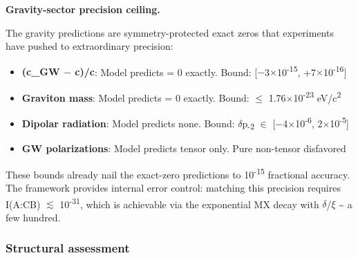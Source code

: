 \documentclass[11pt,a4paper]{article}
\theoremstyle{remark}
\providecommand{\tightlist}{%
  \setlength{\itemsep}{0pt}\setlength{\parskip}{0pt}}
\begin{document}
\textbf{Gravity-sector precision ceiling.}

The gravity predictions are symmetry-protected exact zeros that experiments
have pushed to extraordinary precision:

\begin{itemize}
\tightlist
\item
  \textbf{(c\_GW \ensuremath{-} c)/c}: Model predicts = 0 exactly. Bound: {[}\ensuremath{-}3\ensuremath{\times}10\textsuperscript{-15}, +7\ensuremath{\times}10\textsuperscript{-16}{]}
\item
  \textbf{Graviton mass}: Model predicts = 0 exactly. Bound: \ensuremath{\leq} 1.76\ensuremath{\times}10\textsuperscript{-23} eV/c\textsuperscript{2}
\item
  \textbf{Dipolar radiation}: Model predicts none. Bound: \ensuremath{\delta}p\textsubscript{-2} \ensuremath{\in} {[}\ensuremath{-}4\ensuremath{\times}10\textsuperscript{-6}, 2\ensuremath{\times}10\textsuperscript{-5}{]}
\item
  \textbf{GW polarizations}: Model predicts tensor only. Pure non-tensor disfavored
\end{itemize}

These bounds already nail the exact-zero predictions to 10\textsuperscript{-15} fractional
accuracy. The framework provides internal error control: matching this
precision requires I(A:C\textbar B) \ensuremath{\lesssim} 10\textsuperscript{-31}, which is achievable via the
exponential MX decay with \ensuremath{\delta}/\ensuremath{\xi} \textasciitilde{} a few hundred.

\subsubsection{Structural assessment}\label{structural-assessment}
\end{document}
